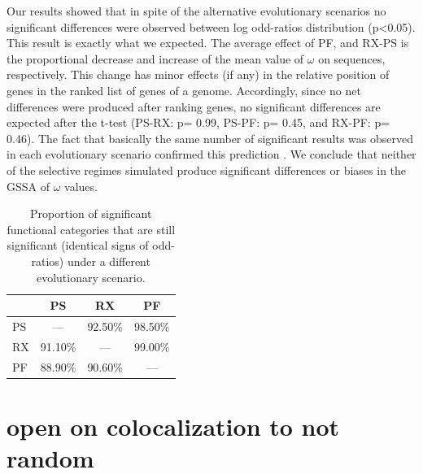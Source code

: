 Our results showed that in spite of the alternative evolutionary scenarios no significant differences were observed between log odd-ratios distribution (p<0.05). This result is exactly what we expected. The average effect of PF, and RX-PS is the proportional decrease and increase of the mean value of $\omega$ on sequences, respectively. This change has minor effects (if any) in the relative position of genes in the ranked list of genes of a genome. Accordingly, since no net differences were produced after ranking genes, no significant differences are expected after the t-test (PS-RX: p= 0.99, PS-PF: p= 0.45, and RX-PF: p= 0.46). The fact that basically the same number of significant results was observed in each evolutionary scenario confirmed this prediction . We conclude that neither of the selective regimes simulated produce significant differences or biases in the GSSA of $\omega$ values.


\begin{table}[htbp]
\begin{center}
\begin{tabular}{l c c c}
\hline
 & PS & RX & PF \\ \hline
PS & --- & 92.50\% & 98.50\% \\
RX & 91.10\% & --- & 99.00\% \\
PF & 88.90\% & 90.60\% & --- \\ \hline
\end{tabular}
\end{center}
\caption[Proportion of significant functional categories that are still significant.]{Proportion of significant functional categories that are still significant (identical signs of odd-ratios) under a different evolutionary scenario.}
\label{tab:prop_signif}
\end{table}

\section{open on colocalization to not random}


